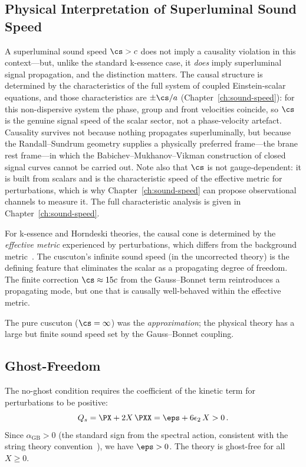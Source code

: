 \subsection{Physical Interpretation of Superluminal Sound Speed}
\label{sec:1-superluminal}

A superluminal sound speed $\cs > c$ does not imply a causality violation in this context---but, unlike the standard k-essence case, it \emph{does} imply superluminal signal propagation, and the distinction matters. The causal structure is determined by the characteristics of the full system of coupled Einstein-scalar equations, and those characteristics are $\pm\cs/a$ (Chapter~\ref{ch:sound-speed}): for this non-dispersive system the phase, group and front velocities coincide, so $\cs$ is the genuine signal speed of the scalar sector, not a phase-velocity artefact. Causality survives not because nothing propagates superluminally, but because the Randall--Sundrum geometry supplies a physically preferred frame---the brane rest frame---in which the Babichev--Mukhanov--Vikman construction of closed signal curves cannot be carried out. Note also that $\cs$ is not gauge-dependent: it is built from scalars and is the characteristic speed of the effective metric for perturbations, which is why Chapter~\ref{ch:sound-speed} can propose observational channels to measure it. The full characteristic analysis is given in Chapter~\ref{ch:sound-speed}.

For k-essence and Horndeski theories, the causal cone is determined by the \emph{effective metric} experienced by perturbations, which differs from the background metric~\cite{ch1:babichev08,ch1:adams06,ch1:lovelock71,ch1:bruneton07}. The cuscuton's infinite sound speed (in the uncorrected theory) is the defining feature that eliminates the scalar as a propagating degree of freedom. The finite correction $\cs \approx 15c$ from the Gauss--Bonnet term reintroduces a propagating mode, but one that is causally well-behaved within the effective metric.

The pure cuscuton ($\cs = \infty$) was the \emph{approximation}; the physical theory has a large but finite sound speed set by the Gauss--Bonnet coupling.

\subsection{Ghost-Freedom}
\label{sec:1-ghost-freedom}

The no-ghost condition requires the coefficient of the kinetic term for perturbations to be positive:
\begin{equation}
\label{eq:1-no-ghost}
Q_s = \PX + 2X\,\PXX = \eps + 6\epsilon_2\, X > 0\,.
\end{equation}
Since $\alpha_{\mathrm{GB}} > 0$ (the standard sign from the spectral action, consistent with the string theory convention~\cite{ch1:lovelock71,ch1:boulware-deser}), we have $\eps > 0$. The theory is ghost-free for all $X \geq 0$.

